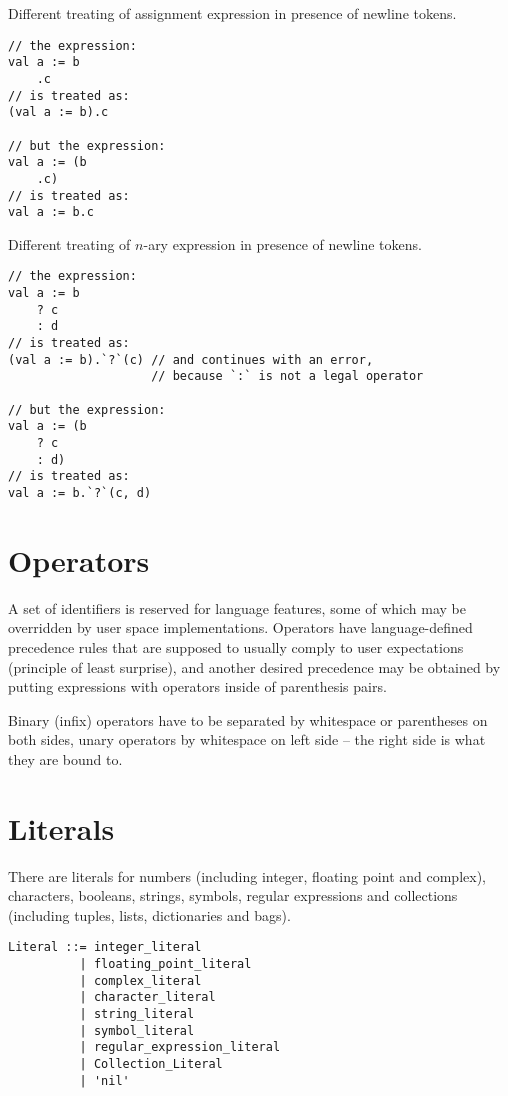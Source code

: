 \example Different treating of assignment expression in presence of newline tokens. 
\begin{lstlisting}
// the expression:
val a := b
    .c
// is treated as:
(val a := b).c

// but the expression:
val a := (b
    .c)
// is treated as:
val a := b.c 
\end{lstlisting}

\example Different treating of $n$-ary expression in presence of newline tokens.
\begin{lstlisting}
// the expression:
val a := b
    ? c
    : d
// is treated as:
(val a := b).`?`(c) // and continues with an error,
                    // because `:` is not a legal operator

// but the expression:
val a := (b
    ? c
    : d)
// is treated as:
val a := b.`?`(c, d) 
\end{lstlisting}






\section{Operators}\label{sec:operators}
A set of identifiers is reserved for language features, some of which may be overridden by user space implementations. Operators have language-defined precedence rules that are supposed to usually comply to user expectations (principle of least surprise), and another desired precedence may be obtained by putting expressions with operators inside of parenthesis pairs. 

Binary (infix) operators have to be separated by whitespace or parentheses on both sides, unary operators by whitespace on left side -- the right side is what they are bound to. 






\section{Literals}\label{sec:literals}

There are literals for numbers (including integer, floating point and complex), characters, booleans, strings, symbols, regular expressions and collections (including tuples, lists, dictionaries and bags). 

\syntax\begin{lstlisting}
Literal ::= integer_literal
	      | floating_point_literal
	      | complex_literal
	      | character_literal
	      | string_literal
	      | symbol_literal
	      | regular_expression_literal
	      | Collection_Literal
	      | 'nil'
\end{lstlisting}






